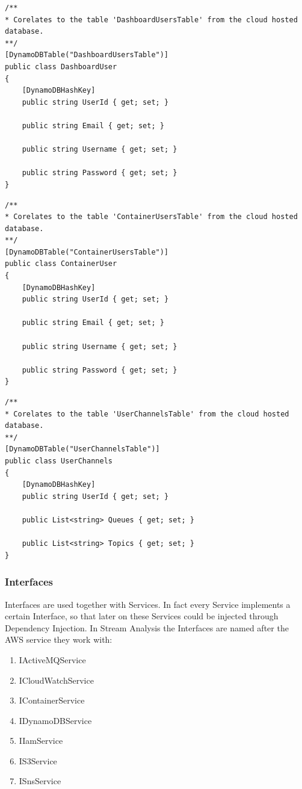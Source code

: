 \begin{lstlisting}
/**
* Corelates to the table 'DashboardUsersTable' from the cloud hosted database.
**/
[DynamoDBTable("DashboardUsersTable")]
public class DashboardUser
{
	[DynamoDBHashKey]
	public string UserId { get; set; }
	
	public string Email { get; set; }
	
	public string Username { get; set; }
	
	public string Password { get; set; }
}
\end{lstlisting}

\begin{lstlisting}
/**
* Corelates to the table 'ContainerUsersTable' from the cloud hosted database.
**/
[DynamoDBTable("ContainerUsersTable")]
public class ContainerUser
{
	[DynamoDBHashKey]
	public string UserId { get; set; }
	
	public string Email { get; set; }
	
	public string Username { get; set; }
	
	public string Password { get; set; }
}
\end{lstlisting}

\begin{lstlisting}
/**
* Corelates to the table 'UserChannelsTable' from the cloud hosted database.
**/
[DynamoDBTable("UserChannelsTable")]
public class UserChannels
{
	[DynamoDBHashKey]
	public string UserId { get; set; }
	
	public List<string> Queues { get; set; }
	
	public List<string> Topics { get; set; }
}
\end{lstlisting}

\subsubsection{Interfaces}
\label{chap:04:02:03:05}

Interfaces are used together with Services. In fact every Service implements a certain Interface, so that later on these Services could be injected through Dependency Injection. In Stream Analysis the Interfaces are named after the AWS service they work with:
\begin{enumerate}
	\item IActiveMQService
	\item ICloudWatchService
	\item IContainerService
	\item IDynamoDBService
	\item IIamService
	\item IS3Service
	\item ISnsService
\end{enumerate}

